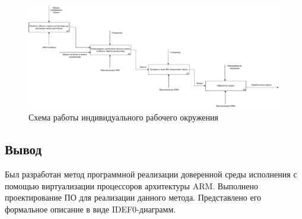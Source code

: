 \begin{figure}[h]
	\centering
	\includegraphics[width=\textwidth]{img/idef0-trap-and-emulate-2.pdf}
	\caption{Схема работы индивидуального рабочего окружения}
	\label{fig:idef0-trap-and-emulate-2}
\end{figure}

\subsection*{Вывод}

Был разработан метод программной реализации доверенной среды исполнения с помощью виртуализации процессоров архитектуры ARM. Выполнено проектирование ПО для реализации данного метода. Представлено его формальное описание в виде IDEF0-диаграмм.

\pagebreak
